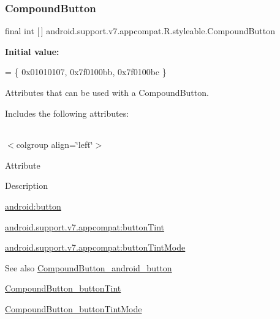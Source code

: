\subsubsection{\texorpdfstring{Compound\+Button}{CompoundButton}}
{\footnotesize\ttfamily final int \mbox{[}$\,$\mbox{]} android.\+support.\+v7.\+appcompat.\+R.\+styleable.\+Compound\+Button\hspace{0.3cm}{\ttfamily [static]}}

{\bfseries Initial value\+:}
\begin{DoxyCode}
= \{
            0x01010107, 0x7f0100bb, 0x7f0100bc
        \}
\end{DoxyCode}
Attributes that can be used with a Compound\+Button. 

Includes the following attributes\+:

\tabulinesep=1mm
\begin{longtabu} spread 0pt [c]{*{0}{|X[-1]}|}
\hline
\end{longtabu}
$<$colgroup align=\char`\"{}left\char`\"{}$>$ 

Attribute

Description 

{\ttfamily \hyperlink{classandroid_1_1support_1_1v7_1_1appcompat_1_1R_1_1styleable_a55ce03c45fd67f3f9d49bc0a3eff3230}{android\+:button}}

{\ttfamily \hyperlink{classandroid_1_1support_1_1v7_1_1appcompat_1_1R_1_1styleable_a332cba791529259530adf3858cb6f97b}{android.\+support.\+v7.\+appcompat\+:button\+Tint}}

{\ttfamily \hyperlink{classandroid_1_1support_1_1v7_1_1appcompat_1_1R_1_1styleable_a0365578c9542a2110fb6a88b59d2d604}{android.\+support.\+v7.\+appcompat\+:button\+Tint\+Mode}}

\begin{DoxySeeAlso}{See also}
\hyperlink{classandroid_1_1support_1_1v7_1_1appcompat_1_1R_1_1styleable_a55ce03c45fd67f3f9d49bc0a3eff3230}{Compound\+Button\+\_\+android\+\_\+button} 

\hyperlink{classandroid_1_1support_1_1v7_1_1appcompat_1_1R_1_1styleable_a332cba791529259530adf3858cb6f97b}{Compound\+Button\+\_\+button\+Tint} 

\hyperlink{classandroid_1_1support_1_1v7_1_1appcompat_1_1R_1_1styleable_a0365578c9542a2110fb6a88b59d2d604}{Compound\+Button\+\_\+button\+Tint\+Mode} 
\end{DoxySeeAlso}
\mbox{\label{classandroid_1_1support_1_1v7_1_1appcompat_1_1R_1_1styleable_a55ce03c45fd67f3f9d49bc0a3eff3230}} 
